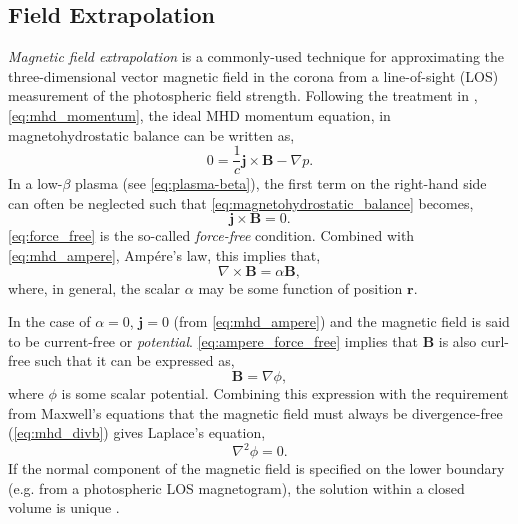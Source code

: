 \subsection{Field Extrapolation}\label{sec:field_extrapolation}

\textit{Magnetic field extrapolation} is a commonly-used technique for approximating the three-dimensional vector magnetic field in the corona from a line-of-sight (LOS) measurement of the photospheric field strength. Following the treatment in \citet[Chapter 3]{priest_magnetohydrodynamics_2014}, \autoref{eq:mhd_momentum}, the ideal MHD momentum equation, in magnetohydrostatic balance can be written as,
\begin{equation}\label{eq:magnetohydrostatic_balance}
    0 = \frac{1}{c}\mathbf{j}\times\mathbf{B} - \nabla p.
\end{equation}
In a low-$\beta$ plasma (see \autoref{eq:plasma-beta}), the first term on the right-hand side can often be neglected such that \autoref{eq:magnetohydrostatic_balance} becomes,
\begin{equation}\label{eq:force_free}
    \mathbf{j}\times\mathbf{B} = 0.
\end{equation}
\autoref{eq:force_free} is the so-called \textit{force-free} condition. Combined with \autoref{eq:mhd_ampere}, Amp\'{e}re's law, this implies that,
\begin{equation}\label{eq:ampere_force_free}
    \nabla\times\mathbf{B} = \alpha\mathbf{B},
\end{equation}
where, in general, the scalar $\alpha$ may be some function of position $\mathbf{r}$.

In the case of $\alpha=0$, $\mathbf{j}=0$ (from \autoref{eq:mhd_ampere}) and the magnetic field is said to be current-free or \textit{potential}. \autoref{eq:ampere_force_free} implies that $\mathbf{B}$ is also curl-free such that it can be expressed as,
\begin{equation}\label{eq:b_potential}
    \mathbf{B}=\nabla\phi,
\end{equation}
 where $\phi$ is some scalar potential. Combining this expression with the requirement from Maxwell's equations that the magnetic field must always be divergence-free (\autoref{eq:mhd_divb}) gives Laplace's equation,
\begin{equation}\label{eq:laplace}
    \nabla^2\phi = 0.
\end{equation}
If the normal component of the magnetic field is specified on the lower boundary (e.g. from a photospheric LOS magnetogram), the solution within a closed volume is unique \citep{priest_magnetohydrodynamics_2014}.

